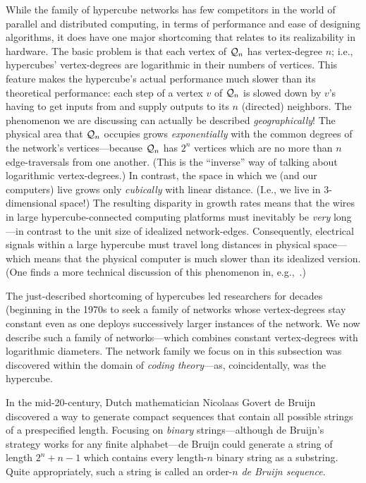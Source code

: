 While the family of hypercube networks has few competitors in the world of parallel and distributed computing, in terms of performance and ease of designing algorithms, it does have one major shortcoming that relates to its realizability in hardware.  The basic problem is that each vertex of $\mbox{$\cal Q$}_n$ has vertex-degree $n$; i.e., hypercubes' vertex-degrees are logarithmic in their numbers of vertices.  This feature makes the hypercube's actual performance much slower than its theoretical performance: each step of a vertex $v$ of $\mbox{$\cal Q$}_n$ is slowed down by $v$'s having to get inputs from and supply outputs to its $n$ (directed) neighbors.  The phenomenon we are discussing can actually be described {\em geographically}!  The physical area that $\mbox{$\cal Q$}_n$ occupies grows {\em exponentially} with the common degrees of the network's vertices---because $\mbox{$\cal Q$}_n$ has $2^n$ vertices which are no more than $n$ edge-traversals from one another.  (This is the ``inverse'' way of talking about logarithmic vertex-degrees.)  In contrast, the space in which we (and our computers) live grows only {\em cubically} with linear distance.  (I.e., we live in $3$-dimensional space!)  The resulting disparity in growth rates means that the wires in large hypercube-connected
computing platforms must inevitably be {\em very} long---in contrast to the unit size of idealized network-edges.  Consequently, electrical signals within a large hypercube must travel long distances in physical space---which means that the physical computer is much slower than its idealized version.  (One finds a more technical discussion of this phenomenon in, e.g.,~\cite{Ullman84}.)

\smallskip

The just-described shortcoming of hypercubes led researchers for decades (beginning in the 1970s to seek a family of networks whose vertex-degrees stay constant even as one deploys successively larger instances of the network.  We now describe such a family of networks---which combines constant vertex-degrees with logarithmic diameters.  The network family we focus on in this subsection was discovered within the domain of {\it coding theory}---as, coincidentally, was the hypercube.  

\medskip

 

In the mid-20-century, Dutch mathematician Nicolaas Govert de Bruijn discovered a way to generate compact sequences that contain all possible strings of a prespecified length.  Focusing on {\em binary} strings---although de Bruijn's strategy works for any finite alphabet---de Bruijn could generate a string of length $2^n +n-1$ which contains every length-$n$ binary string as a substring.  Quite appropriately, such a string is called an order-$n$ {\it de Bruijn sequence}.

